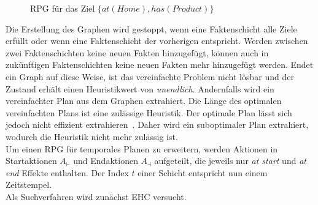 \begin{figure}[ht!]
    \caption{\acl{RPG} für das Ziel $\{at(Home), has(Product)\}$}
    \label{fig:rpg}
\end{figure}
Die Erstellung des Graphen wird gestoppt, wenn eine Faktenschicht alle Ziele erfüllt oder wenn eine Faktenschicht der vorherigen entspricht.
Werden zwischen zwei Faktenschichten keine neuen Fakten hinzugefügt, können auch in zukünftigen Faktenschichten keine neuen Fakten mehr hinzugefügt werden.
Endet ein Graph auf diese Weise, ist das vereinfachte Problem nicht lösbar und der Zustand erhält einen Heuristikwert von \emph{unendlich}.
Andernfalls wird ein vereinfachter Plan aus dem Graphen extrahiert.
Die Länge des optimalen vereinfachten Plans ist eine zulässige Heuristik.
Der optimale Plan lässt sich jedoch nicht effizient extrahieren~\cite{hoffmannnebel2001}.
Daher wird ein suboptimaler Plan extrahiert, wodurch die Heuristik nicht mehr zulässig ist.\\
Um einen \ac{RPG} für temporales Planen zu erweitern, werden Aktionen in Startaktionen $A_\vdash$ und Endaktionen $A_\dashv$ aufgeteilt, die jeweils nur \emph{at start} und \emph{at end} Effekte enthalten.
Der Index $t$ einer Schicht entspricht nun einem Zeitstempel.\\
Als Suchverfahren wird zunächst \ac{EHC} versucht.
